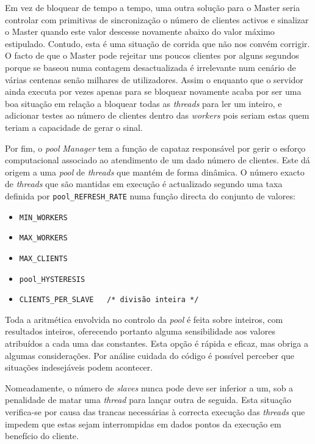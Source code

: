 	\setlength{\parskip}{5pt}		%

	Em vez de bloquear de tempo a tempo, uma outra solução para o Master seria controlar com primitivas de sincronização o número de clientes activos e sinalizar o Master quando este valor descesse novamente abaixo do valor máximo estipulado.
	Contudo, esta é uma situação de corrida que não nos convém corrigir.
	O facto de que o Master pode rejeitar uns poucos clientes por alguns segundos porque se baseou numa contagem desactualizada é irrelevante num cenário de várias centenas senão milhares de utilizadores.
	Assim o enquanto que o servidor ainda executa por vezes apenas para se bloquear novamente acaba por ser uma boa situação em relação a bloquear todas as \emph{threads} para ler um inteiro, e adicionar testes ao número de clientes dentro das \emph{workers} pois seriam estas quem teriam a capacidade de gerar o sinal.


	\setlength{\parskip}{20pt}		%

	Por fim, o \emph{pool} \emph{Manager} tem a função de capataz responsável por gerir o esforço computacional associado ao atendimento de um dado número de clientes.
	Este dá origem a uma \emph{pool} de \emph{threads} que mantém de forma dinâmica.
	O número exacto de \emph{threads} que são mantidas em execução é actualizado segundo uma taxa definida por \verb|pool_REFRESH_RATE| numa função directa do conjunto de valores:

	\setlength{\parskip}{5pt}		%

	\begin{itemize}
		\setlength{\parskip}{-3pt}
		\item{\verb|MIN_WORKERS|}
		\item{\verb|MAX_WORKERS|}
		\item{\verb|MAX_CLIENTS|}
		\item{\verb|pool_HYSTERESIS|}
		\item{\verb|CLIENTS_PER_SLAVE	/* divisão inteira */|}
	\end{itemize}

	Toda a aritmética envolvida no controlo da \emph{pool} é feita sobre inteiros, com resultados inteiros, oferecendo portanto alguma sensibilidade aos valores atribuídos a cada uma das constantes.
	Esta opção é rápida e eficaz, mas obriga a algumas considerações.
	Por análise cuidada do código é possível perceber que situações indesejáveis podem acontecer.

	Nomeadamente, o número de \emph{slaves} nunca pode deve ser inferior a um, sob a penalidade de matar uma \emph{thread} para lançar outra de seguida.
	Esta situação verifica-se por causa das trancas necessárias à correcta execução das \emph{threads} que impedem que estas sejam interrompidas em dados pontos da execução em benefício do cliente.

